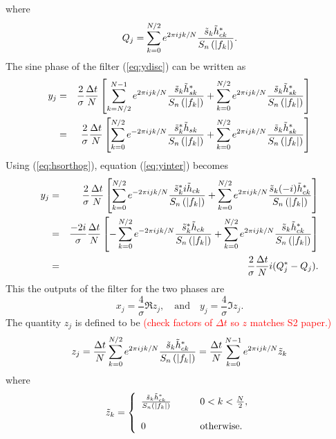 where
\begin{equation}
\label{eq:Qdef}
Q_j = \sum_{k=0}^{N/2} e^{2\pi ijk/N} 
  \frac{\tilde{s}_k \tilde{h}_{ck}^\ast}{S_n\left(\left|f_{k}\right|\right)}.
\end{equation}
The sine phase of the filter (\ref{eq:ydisc}) can be written as
\begin{eqnarray}
\label{eq:yinter}
y_j &=&
\frac{2}{\sigma}\frac{\Delta t}{N}
\left[
  \sum_{k=N/2}^{N-1} e^{2\pi ijk/N} 
  \frac{\tilde{s}_k \tilde{h}_{sk}^\ast}{S_n\left(\left|f_{k}\right|\right)}
  +
  \sum_{k=0}^{N/2} e^{2\pi ijk/N} 
  \frac{\tilde{s}_k \tilde{h}_{sk}^\ast}{S_n\left(\left|f_{k}\right|\right)}
\right] \\
&=& 
\frac{2}{\sigma}\frac{\Delta t}{N}
\left[
  \sum_{k=0}^{N/2} e^{-2\pi ijk/N} 
  \frac{\tilde{s}_k^\ast \tilde{h}_{sk}}{S_n\left(\left|f_{k}\right|\right)}
  +
  \sum_{k=0}^{N/2} e^{2\pi ijk/N} 
  \frac{\tilde{s}_k \tilde{h}_{sk}^\ast}{S_n\left(\left|f_{k}\right|\right)}
\right]
\end{eqnarray}
Using (\ref{eq:hsorthog}), equation (\ref{eq:yinter}) becomes
\begin{eqnarray}
y_j &=& 
\frac{2}{\sigma}\frac{\Delta t}{N}
\left[
  \sum_{k=0}^{N/2} e^{-2\pi ijk/N} 
  \frac{\tilde{s}_k^\ast i\tilde{h}_{ck}}{S_n\left(\left|f_{k}\right|\right)}
  +
  \sum_{k=0}^{N/2} e^{2\pi ijk/N} 
  \frac{\tilde{s}_k (-i)\tilde{h}_{ck}^\ast}{S_n\left(\left|f_{k}\right|\right)}
\right] \\
&=& 
\frac{-2i}{\sigma}\frac{\Delta t}{N}
\left[
  - \sum_{k=0}^{N/2} e^{-2\pi ijk/N} 
  \frac{\tilde{s}_k^\ast \tilde{h}_{ck}}{S_n\left(\left|f_{k}\right|\right)}
  +
  \sum_{k=0}^{N/2} e^{2\pi ijk/N} 
  \frac{\tilde{s}_k \tilde{h}_{ck}^\ast}{S_n\left(\left|f_{k}\right|\right)}
\right] \\
&=& 
\frac{2}{\sigma}\frac{\Delta t}{N}i(Q_j^\ast - Q_j).
\end{eqnarray}
This the outputs of the filter for the two phases are
\begin{equation}
x_j = \frac{4}{\sigma} \Re z_j,
\quad\mathrm{and}\quad
y_j = \frac{4}{\sigma} \Im z_j.
\end{equation}
The quantity $z_j$ is defined to be \textcolor{red}{(check factors 
of $\Delta t$ so $z$ matches S2 paper.)}
\begin{equation}
\label{eq:zdef}
z_j = \frac{\Delta t}{N}\sum_{k=0}^{N/2} e^{2\pi ijk/N} 
\frac{\tilde{s}_k \tilde{h}_{ck}^\ast}{S_n\left(\left|f_{k}\right|\right)} 
= \frac{\Delta t}{N}\sum_{k=0}^{N-1} e^{2\pi ijk/N} \tilde{z}_k
\end{equation}
where
\begin{equation}
\label{eq:ztildedef}
\tilde{z}_k = \left\{
\begin{array}{ll}
\frac{\tilde{s}_k \tilde{h}_{ck}^\ast}{S_n\left(\left|f_{k}\right|\right)} 
  \quad\quad & 0 < k < \frac{N}{2},\\
\\
0 & \mathrm{otherwise}.
\end{array}
\right.
\end{equation}
